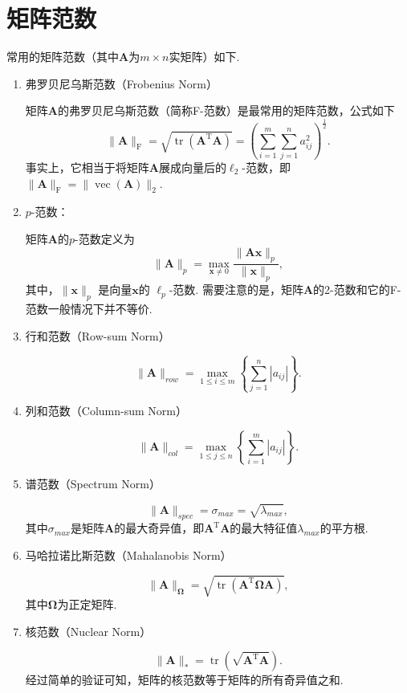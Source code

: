 \section{矩阵范数}

常用的矩阵范数（其中\( \mathbf{A} \)为\( m \times n \)实矩阵）如下.

\begin{enumerate}[leftmargin=0em, listparindent=2em, itemindent=2em]
    \item 弗罗贝尼乌斯范数（Frobenius Norm）

          矩阵\( \mathbf{A} \)的弗罗贝尼乌斯范数（简称F-范数）是最常用的矩阵范数，公式如下
          \[
              \|\mathbf{A}\|_{\mathrm{F}} = \sqrt{\operatorname{tr}(\mathbf{A}^{\mathrm{T}}\mathbf{A})} = \left(\sum_{i=1}^m \sum_{j=1}^n a_{ij}^2\right)^{\frac{1}{2}}.
          \]
          事实上，它相当于将矩阵\( \mathbf{A} \)展成向量后的$\ell_2$-范数，即 $\|\mathbf{A}\|_{\mathrm{F}} = \|\operatorname{vec}(\mathbf{A})\|_2$.
    \item $p$-范数：

          矩阵\( \mathbf{A} \)的$p$-范数定义为
          \[
              \|\mathbf{A}\|_p = \max_{\bm{x} \neq 0} \frac{\|\mathbf{A}\bm{x}\|_p}{\|\bm{x}\|_p},
          \]
          其中，$\|\bm{x}\|_p$ 是向量\( \bm{x} \)的 \( \ell_p \)-范数. 需要注意的是，矩阵\( \mathbf{A} \)的2-范数和它的F-范数一般情况下并不等价.
    \item 行和范数（Row-sum Norm）

          \[
              \|\mathbf{A}\|_{row} = \max_{1\leq i\leq m} \left\{\sum_{j=1}^n |a_{ij}|\right\}.
          \]

    \item 列和范数（Column-sum Norm）

          \[
              \|\mathbf{A}\|_{col} = \max_{1\leq j\leq n} \left\{\sum_{i=1}^m |a_{ij}|\right\}.
          \]

    \item 谱范数（Spectrum Norm）

          \[
              \|\mathbf{A}\|_{spec} = \sigma_{max} = \sqrt{\lambda_{max}},
          \]
          其中$\sigma_{max}$是矩阵\( \mathbf{A} \)的最大奇异值，即$\mathbf{A}^{\mathrm{T}}\mathbf{A}$的最大特征值$\lambda_{max}$的平方根.

    \item 马哈拉诺比斯范数（Mahalanobis Norm）

          \[
              \|\mathbf{A}\|_{\mathbf{\Omega}} = \sqrt{\operatorname{tr}(\mathbf{A}^{\mathrm{T}}\mathbf{\Omega} \mathbf{A})},
          \]
          其中$\mathbf{\Omega}$为正定矩阵.

    \item 核范数（Nuclear Norm）

          \[
              \|\mathbf{A}\|_* = \operatorname{tr}(\sqrt{\mathbf{A}^{\mathrm{T}}\mathbf{A}}).
          \]
          经过简单的验证可知，矩阵的核范数等于矩阵的所有奇异值之和.
\end{enumerate}

